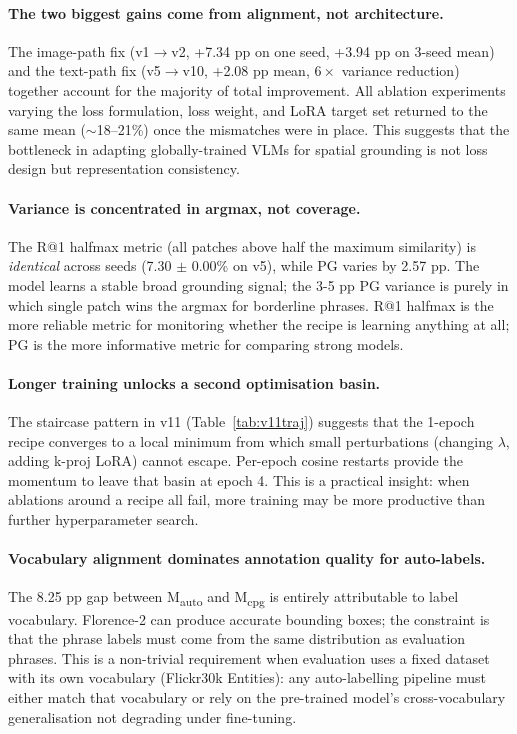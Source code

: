 \documentclass{article}
\begin{document}
\paragraph{The two biggest gains come from alignment, not architecture.}
The image-path fix (v1$\to$v2, +7.34 pp on one seed, +3.94 pp on 3-seed mean)
and the text-path fix (v5$\to$v10, +2.08 pp mean, $6\times$ variance
reduction) together account for the majority of total improvement. All ablation
experiments varying the loss formulation, loss weight, and LoRA target set
returned to the same mean ($\sim$18--21\%) once the mismatches were in place.
This suggests that the bottleneck in adapting globally-trained VLMs for spatial
grounding is not loss design but representation consistency.

\paragraph{Variance is concentrated in argmax, not coverage.}
The R@1 halfmax metric (all patches above half the maximum similarity) is
\emph{identical} across seeds (7.30 $\pm$ 0.00\% on v5), while PG varies by
2.57 pp. The model learns a stable broad grounding signal; the 3-5 pp PG
variance is purely in which single patch wins the argmax for borderline
phrases. R@1 halfmax is the more reliable metric for monitoring whether the
recipe is learning anything at all; PG is the more informative metric for
comparing strong models.

\paragraph{Longer training unlocks a second optimisation basin.}
The staircase pattern in v11 (Table~\ref{tab:v11traj}) suggests that the
1-epoch recipe converges to a local minimum from which small perturbations
(changing $\lambda$, adding k-proj LoRA) cannot escape. Per-epoch cosine
restarts provide the momentum to leave that basin at epoch 4. This is a
practical insight: when ablations around a recipe all fail, more training may
be more productive than further hyperparameter search.

\paragraph{Vocabulary alignment dominates annotation quality for auto-labels.}
The 8.25 pp gap between M\textsubscript{auto} and M\textsubscript{cpg} is
entirely attributable to label vocabulary. Florence-2 can produce accurate
bounding boxes; the constraint is that the phrase labels must come from the same
distribution as evaluation phrases. This is a non-trivial requirement when
evaluation uses a fixed dataset with its own vocabulary (Flickr30k Entities):
any auto-labelling pipeline must either match that vocabulary or rely on the
pre-trained model's cross-vocabulary generalisation not degrading under
fine-tuning.
\end{document}
